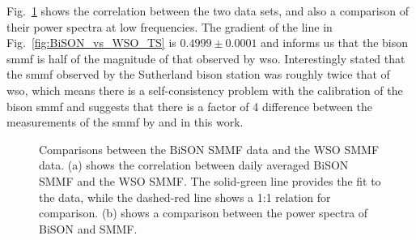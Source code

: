 Fig.~\ref{fig:BiSON_vs_WSO} shows the correlation between the two data sets, and also a comparison of their power spectra at low frequencies. The gradient of the line in Fig.~\ref{fig:BiSON_vs_WSO_TS} is $0.4999\pm0.0001$ and informs us that the \gls{bison} \gls{smmf} is half of the magnitude of that observed by \gls{wso}. Interestingly \citet{chaplin_studies_2003} stated that the \gls{smmf} observed by the Sutherland \gls{bison} station was roughly twice that of \gls{wso}, which means there is a self-consistency problem with the calibration of the \gls{bison} \gls{smmf} and suggests that there is a factor of 4 difference between the measurements of the \gls{smmf} by \citet{chaplin_studies_2003} and in this work.

\begin{figure}[ht!]
	\centering
	\qquad
	\caption{Comparisons between the BiSON SMMF data and the WSO SMMF data. (a) shows the correlation between daily averaged BiSON SMMF and the WSO SMMF. The solid-green line provides the fit to the data, while the dashed-red line shows a 1:1 relation for comparison. (b) shows a comparison between the power spectra of BiSON and SMMF.} \label{fig:BiSON_vs_WSO}
\end{figure}



